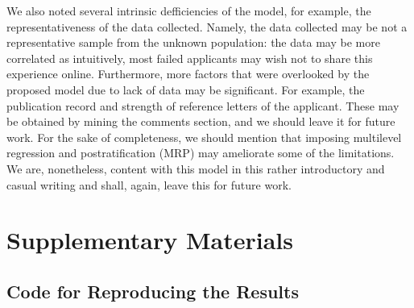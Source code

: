 \documentclass{article}
\begin{document}
    We also noted several intrinsic defficiencies of the model, for example,
    the representativeness of the data collected. Namely,
    the data collected may be not a representative sample
    from the unknown population: the data may be more correlated
    as intuitively, most failed applicants may wish not to share
    this experience online. Furthermore, more factors that were
    overlooked by the proposed model due to lack of data may be
    significant. For example, the publication record and strength of
    reference letters of the applicant. These may be obtained by mining the
    comments section, and we should leave it for future work.
    For the sake of completeness,
    we should mention that imposing multilevel
    regression and postratification (MRP) \cite{Wang:2015:MRP} may ameliorate
    some of the limitations. We are, nonetheless, content with this model
    in this rather introductory and casual writing and shall, again, leave this
    for future work.

\clearpage
{\small
\nocite{*}


}
\section*{Supplementary Materials}
\begin{appendices}
\section{Code for Reproducing the Results}

    
\end{appendices}
\end{document}
